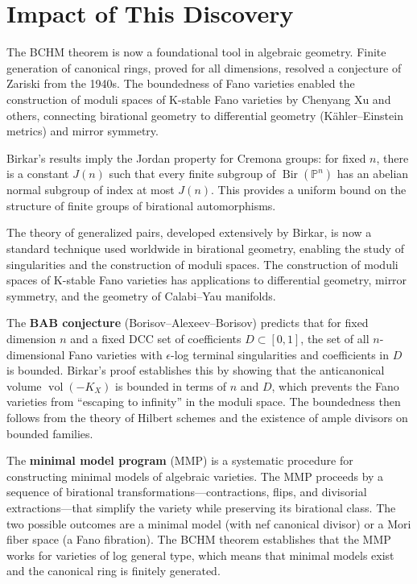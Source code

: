 \section{Impact of This Discovery}

The BCHM theorem is now a foundational tool in algebraic geometry. Finite generation of canonical rings, proved for all dimensions, resolved a conjecture of Zariski from the 1940s. The boundedness of Fano varieties enabled the construction of moduli spaces of K-stable Fano varieties by Chenyang Xu and others, connecting birational geometry to differential geometry (K\"ahler--Einstein metrics) and mirror symmetry.

Birkar's results imply the Jordan property for Cremona groups: for fixed $n$, there is a constant $J(n)$ such that every finite subgroup of $\operatorname{Bir}(\mathbb{P}^n)$ has an abelian normal subgroup of index at most $J(n)$. This provides a uniform bound on the structure of finite groups of birational automorphisms.

The theory of generalized pairs, developed extensively by Birkar, is now a standard technique used worldwide in birational geometry, enabling the study of singularities and the construction of moduli spaces. The construction of moduli spaces of K-stable Fano varieties has applications to differential geometry, mirror symmetry, and the geometry of Calabi--Yau manifolds.

The \textbf{BAB conjecture} (Borisov--Alexeev--Borisov) predicts that for fixed dimension $n$ and a fixed DCC set of coefficients $D \subset [0,1]$, the set of all $n$-dimensional Fano varieties with $\epsilon$-log terminal singularities and coefficients in $D$ is bounded. Birkar's proof establishes this by showing that the anticanonical volume $\operatorname{vol}(-K_X)$ is bounded in terms of $n$ and $D$, which prevents the Fano varieties from ``escaping to infinity'' in the moduli space. The boundedness then follows from the theory of Hilbert schemes and the existence of ample divisors on bounded families.

The \textbf{minimal model program} (MMP) is a systematic procedure for constructing minimal models of algebraic varieties. The MMP proceeds by a sequence of birational transformations---contractions, flips, and divisorial extractions---that simplify the variety while preserving its birational class. The two possible outcomes are a minimal model (with nef canonical divisor) or a Mori fiber space (a Fano fibration). The BCHM theorem establishes that the MMP works for varieties of log general type, which means that minimal models exist and the canonical ring is finitely generated.


